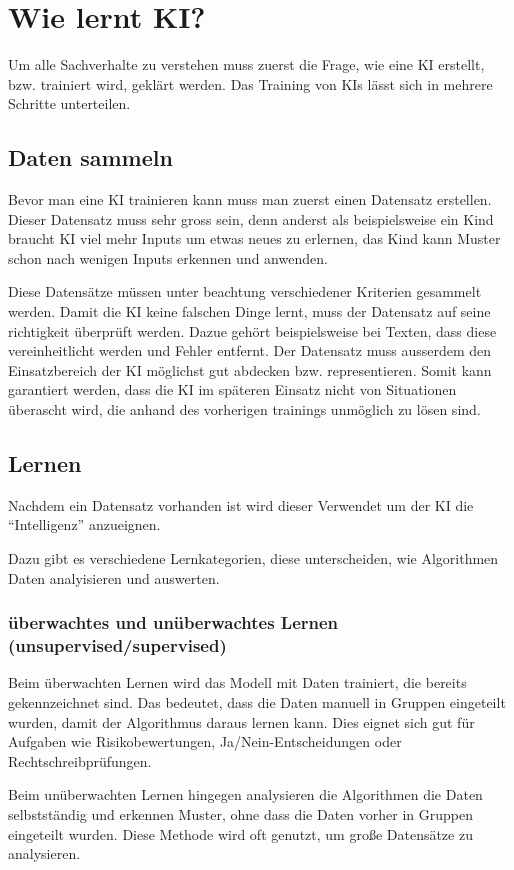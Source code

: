 \chapter{Wie lernt KI?}
\label{chap:ai-training}

Um alle Sachverhalte zu verstehen muss zuerst die Frage, wie eine KI erstellt, bzw. trainiert wird, geklärt werden.
Das Training von KIs lässt sich in mehrere Schritte unterteilen.

\section{Daten sammeln}
Bevor man eine KI trainieren kann muss man zuerst einen Datensatz erstellen. Dieser Datensatz muss sehr gross sein, denn anderst als beispielsweise ein Kind braucht KI viel mehr Inputs um etwas neues zu erlernen, das Kind kann Muster schon nach wenigen Inputs erkennen und anwenden.

Diese Datensätze müssen unter beachtung verschiedener Kriterien gesammelt werden. 
Damit die KI keine falschen Dinge lernt, muss der Datensatz auf seine richtigkeit überprüft werden. Dazue gehört beispielsweise bei Texten, dass diese vereinheitlicht werden und Fehler entfernt.
Der Datensatz muss ausserdem den Einsatzbereich der KI möglichst gut abdecken bzw. representieren. Somit kann garantiert werden, dass die KI im späteren Einsatz nicht von Situationen überascht wird, die anhand des vorherigen trainings unmöglich zu lösen sind.

\section{Lernen}
Nachdem ein Datensatz vorhanden ist wird dieser Verwendet um der KI die \enquote{Intelligenz} anzueignen. 

Dazu gibt es verschiedene Lernkategorien, diese unterscheiden, wie Algorithmen Daten analyisieren und auswerten.
\subsection{überwachtes und unüberwachtes Lernen (unsupervised/supervised)}
Beim überwachten Lernen wird das Modell mit Daten trainiert, die bereits gekennzeichnet sind. Das bedeutet, dass die Daten manuell in Gruppen eingeteilt wurden, damit der Algorithmus daraus lernen kann. 
Dies eignet sich gut für Aufgaben wie Risikobewertungen, Ja/Nein-Entscheidungen oder Rechtschreibprüfungen.

Beim unüberwachten Lernen hingegen analysieren die Algorithmen die Daten selbstständig und erkennen Muster, ohne dass die Daten vorher in Gruppen eingeteilt wurden. 
Diese Methode wird oft genutzt, um große Datensätze zu analysieren.

